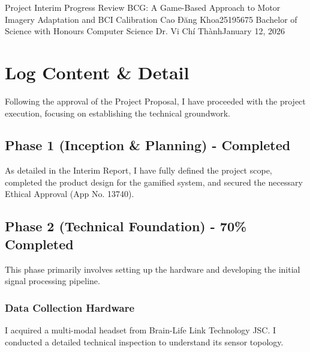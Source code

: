 \documentclass[a4paper, 11pt, openany]{report}
\begin{document}
\reportTitlePage
    {Project Interim Progress Review}
    {BCG: A Game-Based Approach to Motor Imagery Adaptation and BCI Calibration}
    {Cao Đăng Khoa}{25195675}
    {Bachelor of Science with Honours Computer Science}
    {Dr. Vi Chí Thành}{January 12, 2026}
    \thispagestyle{titlepage}

\setcounter{page}{0}

\reportTableOfContents

\reportListOfFigures


\cleardoublepage
{}

\setlength{\parskip}{8pt plus 2pt minus 1pt}


\chapter{Log Content \& Detail}    
    Following the approval of the Project Proposal, I have proceeded with the project execution, focusing on establishing the technical groundwork.
    
    \section{Phase 1 (Inception \& Planning) - Completed}
    As detailed in the Interim Report, I have fully defined the project scope, completed the product design for the gamified system, and secured the necessary Ethical Approval (App No. 13740).
    
    \section{Phase 2 (Technical Foundation) - 70\% Completed}
    This phase primarily involves setting up the hardware and developing the initial signal processing pipeline.

    \subsection{Data Collection Hardware}
    I acquired a multi-modal headset from Brain-Life Link Technology JSC. I conducted a detailed technical inspection to understand its sensor topology.
\end{document}
